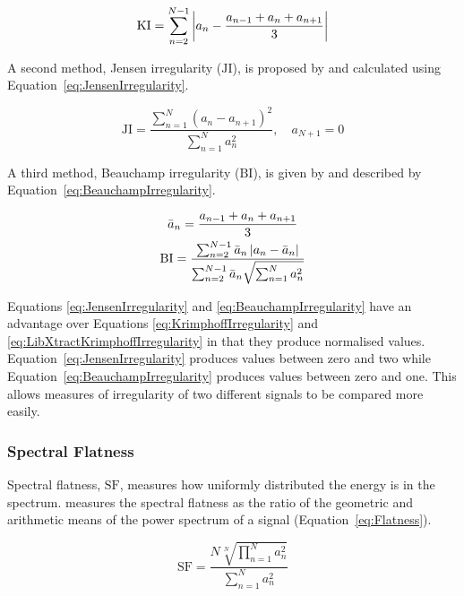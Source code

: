 			\begin{equation}
				\mathrm{KI} = \sum_{n = 2}^{N - 1}
						  \left|a_{n} - \frac{a_{n-1} + a_{n} + a_{n+1}}{3}\right|
				\label{eq:LibXtractKrimphoffIrregularity}
			\end{equation}

			A second method, Jensen irregularity ($\mathrm{JI}$), is proposed by \citet{jensen1999timbre} and
			calculated using Equation~\ref{eq:JensenIrregularity}.

			\begin{equation}
				\mathrm{JI} = \frac{\sum_{n = 1}^{N} (a_{n} - a_{n+1})^{2}}
						   {\sum_{n = 1}^{N} a_{n}^{2}},
					      \quad a_{N+1} = 0
				\label{eq:JensenIrregularity}
			\end{equation}

			A third method, Beauchamp irregularity ($\mathrm{BI}$), is given by \citet{beauchamp2007analysis}
			and described by Equation~\ref{eq:BeauchampIrregularity}.

			\begin{gather}
			        \bar{a}_{n} = \frac{a_{n-1} + a_{n} + a_{n+1}}{3} \nonumber \\
				\mathrm{BI} = \frac{\sum_{n = 2}^{N - 1} \bar{a}_{n} \left|a_{n} - \bar{a}_{n}\right|}
						   {\sum_{n = 2}^{N - 1} \bar{a}_{n} \sqrt{\sum_{n = 1}^{N} a_{n}^{2}}}
				\label{eq:BeauchampIrregularity}
			\end{gather}

			Equations \ref{eq:JensenIrregularity} and \ref{eq:BeauchampIrregularity} have an advantage over
			Equations \ref{eq:KrimphoffIrregularity} and \ref{eq:LibXtractKrimphoffIrregularity} in that they
			produce normalised values. Equation~\ref{eq:JensenIrregularity} produces values between zero and
			two while Equation~\ref{eq:BeauchampIrregularity} produces values between zero and one. This allows
			measures of irregularity of two different signals to be compared more easily.

		\subsubsection*{Spectral Flatness}
			Spectral flatness, $\mathrm{SF}$, measures how uniformly distributed the energy is in the spectrum.
			\citet{johnston1988transform} measures the spectral flatness as the ratio of the geometric and
			arithmetic means of the power spectrum of a signal (Equation~\ref{eq:Flatness}).

			\begin{equation}
				\mathrm{SF} = \frac{N\sqrt[N]{\prod_{n = 1}^{N} a_{n}^{2}}}
						   {\sum_{n = 1}^{N} a_{n}^{2}}
				\label{eq:Flatness}
			\end{equation}

